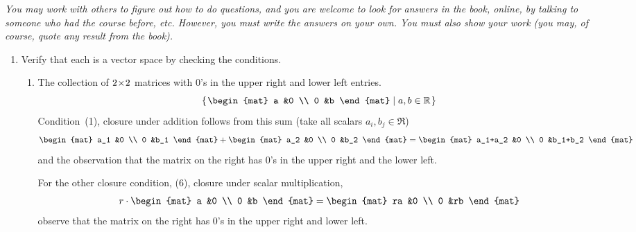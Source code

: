 \documentclass[11pt]{article}
\begin{document}

\vspace*{3ex}
\textit{You may work with others to figure out how to do questions, 
and you are welcome to look for answers in the book, online, by talking
to someone who had the course before, etc.
However, you must write 
the answers on your own.
You must also show your work (you may, of course, 
quote any result from the book).}

\begin{enumerate}
\item Verify that each is a vector space by checking the conditions.
  \begin{enumerate}
  \item The collection of $2 \! \times \! 2$ matrices with $0$'s in the 
    upper right and lower left entries.
    \begin{equation*}
      \set{
        \begin{mat}
          a  &0  \\
          0  &b  
        \end{mat}
        \suchthat a,b\in\Re}
    \end{equation*}
  Condition~(1), closure under addition follows from this sum
  (take all scalars $a_i,b_j\in\Re$)
  \begin{equation*}
    \begin{mat}
      a_1  &0  \\
      0    &b_1
    \end{mat}
    +
    \begin{mat}
      a_2  &0  \\
      0    &b_2
    \end{mat}
    =
    \begin{mat}
      a_1+a_2  &0  \\
      0        &b_1+b_2
    \end{mat}
  \end{equation*}
  and the observation that the matrix on the right has $0$'s in the upper right 
  and the lower left.

  For the other closure condition, (6), closure under scalar multiplication,
  \begin{equation*}
    r\cdot
    \begin{mat}
      a  &0  \\
      0    &b
    \end{mat}
    =
    \begin{mat}
      ra  &0  \\
      0   &rb
    \end{mat}
  \end{equation*}
  observe that the matrix on the right has $0$'s in the upper right and 
  lower left.


\end{enumerate}
\end{enumerate}
\end{document}
